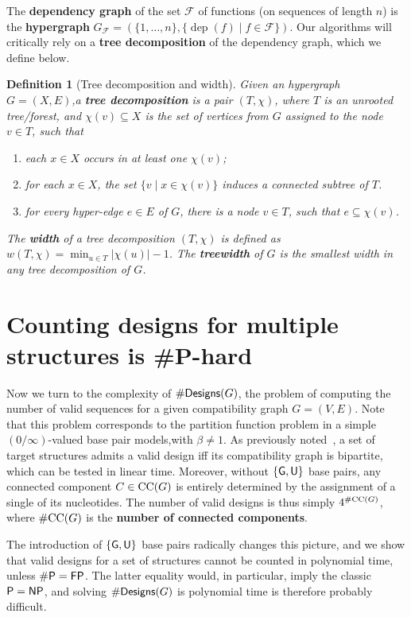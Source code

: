 \documentclass{bioinfo}
\newtheorem{definition}[theorem]{Definition}
\newcommand{\dep}{\operatorname{dep}}
\newcommand{\real}{\mathbb{R}}
\newcommand{\F}{\mathcal{F}}
\newcommand{\width}{w}
\newcommand{\Def}[1]{{\bf #1}}
\newcommand{\NumDesign}{\ensuremath{\#}{\sf Designs}\xspace}
\newcommand{\Nuc}[1]{{\sf #1}}
\newcommand{\Gb}{\Nuc{G}}
\newcommand{\Ub}{\Nuc{U}}
\begin{document}
The \Def{dependency graph} of the set $\F$ of functions (on
sequences of length $n$) is the \Def{hypergraph}
$G_\F=(\{1,\dots,n\} ,\{\dep(f)\mid f\in \F\})$. 
Our algorithms will critically rely on a \Def{tree decomposition} of the dependency graph, which we define below.
\begin{definition}[Tree decomposition and width]
  \label{def:treedecomp}
  Given an hypergraph $G=(X, E)$,a \Def{tree decomposition} is a
  pair $(T,\chi)$, where $T$ is an unrooted tree/forest, and
  $\chi(v)\subseteq X$ is the set of vertices from $G$ assigned to the node $v\in T$, such
  that
\begin{enumerate}
\item each $x\in X$ occurs in at least one $\chi(v)$;
\item for each $x\in X$, the set $\{ v \mid x \in \chi(v) \}$ induces a connected subtree of $T$.
\item for every hyper-edge $e\in E$ of $G$, there is a node $v\in T$, such that $e\subseteq\chi(v)$.
\end{enumerate}
The \Def{width} of a tree decomposition $(T,\chi)$ is defined as
$\width(T,\chi) = \min_{u\in T} |\chi(u)| - 1 $. The \Def{treewidth}
of $G$ is the smallest width in any tree decomposition of $G$.
\end{definition}


\section{Counting designs for multiple structures is \#{\sf P}-hard}\label{sec:counting}

Now we turn to the complexity of $\NumDesign(G)$, the problem of computing the number of valid sequences for a given compatibility graph $G=(V,E)$. Note that this problem corresponds to the partition function problem in a simple $(0/\infty)$-valued base pair models,with $\beta\neq 1$. As previously noted~\cite{Flamm2001}, a set of target structures admits a valid design iff its compatibility graph is bipartite, which can be tested in linear time.
Moreover, without $\{\Gb, \Ub\}$ base pairs, any connected component  $C\in {\rm CC}(G)$ is entirely determined by the assignment of a single of its nucleotides. The number of valid designs is thus simply $4^{\#{\rm CC}(G)}$, where $\#{\rm CC}(G)$ is the \Def{number of connected components}.

The introduction of $\{\Gb, \Ub\}$ base pairs radically changes this picture, and we show that valid designs for a set of structures cannot be counted in polynomial time, unless ${\sf\# P}={\sf FP}$. The latter equality would, in particular, imply the classic ${\sf P}={\sf NP}$, and solving $\NumDesign(G)$ is polynomial time is therefore probably difficult. 
\end{document}
